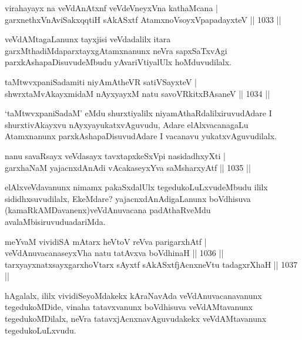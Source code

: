 
\begin{shl}
virahayayx na veVdAnAtxnf veVdeV\s neyxVna kathaMcana |
garxnethxVnA\s\s viSakxqqtiH sAkASxtf AtamxnoV\s soyxVpapadayxteV || 1033 ||
\end{shl}

\begin{artha}
veVdAMtagaLanunx tayxjisi veVdadalilx itara garxMthadiMda\break parxtayxgAtamxnanunx neVra
sapxSaTxvAgi parxkAshapaDisuvudeMbudu yAva\break riVtiyalUlx hoMduvudilalx.
\end{artha}

\begin{shl}
taMtwvxpaniSadamiti niyAmAtheVR satiVSayxteV |\\
shwrxtaMvAkayxmidaM nAyxyayxM natu savoVRkitxBAsaneV || 1034 ||
\end{shl}

\begin{artha}
`taMtwvxpaniSadaM' eMdu shurxtiyalilx niyamAthaRdalilx\break iruvudAdare I shurxtivAkayxvu 
nAyxyayukatxvAguvudu, Adare elAlxvacanagaLu Atamxnanunx parxkAshapaDisuvudAdare I vacanavu 
yukatxvAguvudilalx.
\end{artha}


\begin{shl}
nanu savaRsayx veVdasayx tavxtapxkeSxV\s pi nasidadhxyXti |\\
garxhaNaM yajacnxdAnAdi vAcakaseyxYva saMsharxyAtf || 1035 ||
\end{shl}

\begin{artha}
elAlxveVdavanunx nimamx pakaSxdalUlx tegedukoLuLxvudeMbudu ililx sididhxsuvudilalx, EkeMdare? yajacnxdAnAdigaLanunx boVdhisuva (kamaRkAMDavanenx)veVdAnuvacana padAthaRveMdu avalaMbisiruvudu\break adariMda.
\end{artha}


\begin{shl}
meYvaM vividiSA mAtarx heVtoV reVva parigarxhAtf |\\
veVdAnuvacanaseyxVha natu tatAvxva boVdhinaH || 1036 ||\\
tarxyayxnatxsayxgarxhoVtarx sAyxtf sAkASxtfjAcnxneVtu tadagxrXhaH || 1037 ||
\end{shl}

\begin{artha}
hAgalalx, ililx vividiSeyoMdakekx kAraNavAda veVdAnu\-\break vacanavanunx tegedukoMDide, vinaha 
tatavxvanunx boVdhisuva veVdAMtavanunx tegedukoMDilalx, neVra tatavxjAcnxnavAguvudakekx 
veVdAMtavanunx tegedukoLuLxvudu.
\end{artha}

